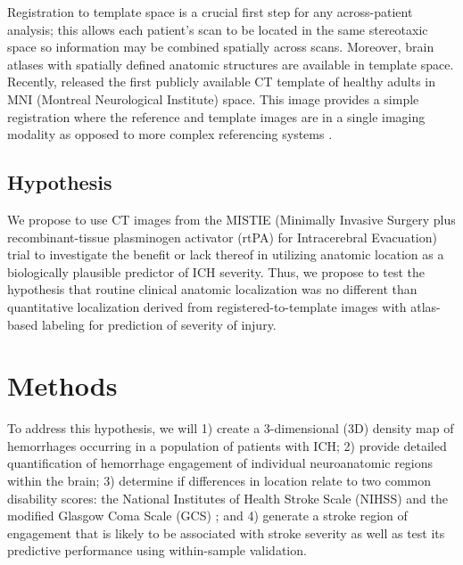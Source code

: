 \documentclass[10pt]{article}\usepackage[]{graphicx}\usepackage[]{color}
\begin{document}
Registration to template space is a crucial first step for any across-patient analysis; this allows each patient's scan to be located in the same stereotaxic space so information may be combined spatially across scans.  Moreover, brain atlases with spatially defined anatomic structures are available in template space.
Recently, \citet{rorden_age-specific_2012} released the first publicly available CT template of healthy adults in MNI (Montreal Neurological Institute) space.  
This image provides a simple registration where the reference and template images are in a single imaging modality as opposed to more complex referencing systems \citep{solomon_user-friendly_2007, li_registration_2010, princich_rapid_2013}.


\subsection{Hypothesis}

We propose to use CT images from the MISTIE (Minimally Invasive Surgery plus recombinant-tissue plasminogen activator (rtPA) for Intracerebral Evacuation) trial to investigate the benefit or lack thereof in utilizing anatomic location as a biologically plausible predictor of ICH severity.  Thus, we propose to test the hypothesis that routine clinical anatomic localization was no different than quantitative localization derived from registered-to-template images with atlas-based labeling for prediction of severity of injury.


\section{Methods}

To address this hypothesis, we will 1) create a 3-dimensional (3D) density map of hemorrhages occurring in a population of patients with ICH; 2) provide detailed quantification of hemorrhage engagement of individual neuroanatomic regions within the brain; 3) determine if differences in location relate to two common disability scores: the National Institutes of Health Stroke Scale (NIHSS) \citep{brott_measurements_1989} 
and the modified Glasgow Coma Scale (GCS) \citep{teasdale_assessment_1974, teasdale_assessment_1976}; and 4) generate a stroke region of engagement that is likely to be associated with stroke severity as well as test its predictive performance using within-sample validation.
\end{document}
